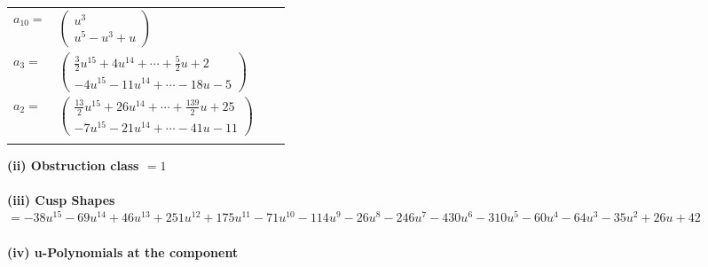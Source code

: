 \documentclass[1p]{elsarticle_modified}
\theoremstyle{definition}
\begin{document}
\begin{tabular}{m{7pt} m{180pt} m{7pt} m{180pt} }
\flushright $a_{10}=$&$\begin{pmatrix}u^3\\u^5- u^3+u\end{pmatrix}$ \\
\flushright $a_{3}=$&$\begin{pmatrix}\frac{3}{2} u^{15}+4 u^{14}+\cdots+\frac{5}{2} u+2\\-4 u^{15}-11 u^{14}+\cdots-18 u-5\end{pmatrix}$ \\
\flushright $a_{2}=$&$\begin{pmatrix}\frac{13}{2} u^{15}+26 u^{14}+\cdots+\frac{139}{2} u+25\\-7 u^{15}-21 u^{14}+\cdots-41 u-11\end{pmatrix}$\\&\end{tabular}
\flushleft \textbf{(ii) Obstruction class $= 1$}\\~\\
\flushleft \textbf{(iii) Cusp Shapes $= -38 u^{15}-69 u^{14}+46 u^{13}+251 u^{12}+175 u^{11}-71 u^{10}-114 u^9-26 u^8-246 u^7-430 u^6-310 u^5-60 u^4-64 u^3-35 u^2+26 u+42$}\\~\\
\newpage\renewcommand{\arraystretch}{1}
\flushleft \textbf{(iv) u-Polynomials at the component}\newline \\
\end{document}
